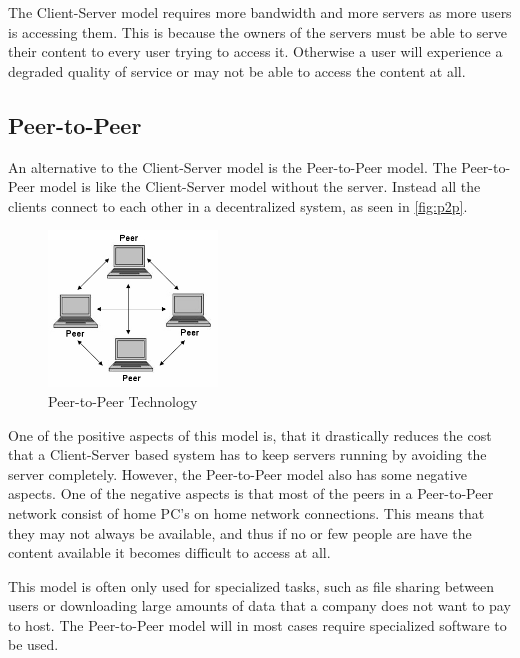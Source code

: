 The Client-Server model requires more bandwidth and more servers as more users is accessing them. This is because the owners of the servers must be able to serve their content to every user trying to access it. Otherwise a user will experience a degraded quality of service or may not be able to access the content at all.

\subsection{Peer-to-Peer}
An alternative to the Client-Server model is the Peer-to-Peer model.
The Peer-to-Peer model is like the Client-Server model without the server.
Instead all the clients connect to each other in a decentralized system, as seen in \autoref{fig:p2p}.

\begin{figure}[ht]
  \centering
    \includegraphics[width=0.4\textwidth]{img/p2p.jpg}
  \caption{Peer-to-Peer Technology \citep{PeerToPeer}}
  \label{fig:p2p}
\end{figure}

One of the positive aspects of this model is, that it drastically reduces the cost that a Client-Server based system has to keep servers running by avoiding the server completely.
However, the Peer-to-Peer model also has some negative aspects.
One of the negative aspects is that most of the peers in a Peer-to-Peer network consist of home PC's on home network connections. This means that they may not always be available, and thus if no or few people are have the content available it becomes difficult to access at all.

This model is often only used for specialized tasks, such as file sharing between users or downloading large amounts of data that a company does not want to pay to host.
The Peer-to-Peer model will in most cases require specialized software to be used.